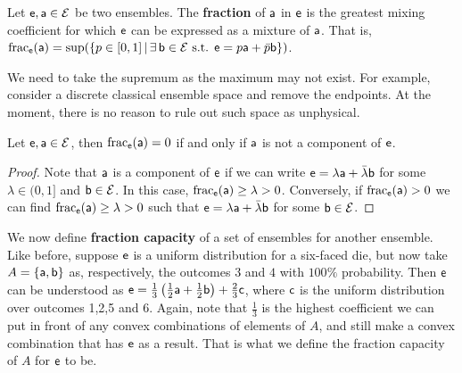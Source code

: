 \begin{mathSection}
	\begin{defn}
		Let $\ens, \ens[a] \in \Ens$ be two ensembles. The \textbf{fraction} of $\ens[a]$ in $\ens$ is the greatest mixing coefficient for which $\ens$ can be expressed as a mixture of $\ens[a]$. That is, $\size_{\ens}(\ens[a]) = \sup(\{ p \in [0,1] \, | \, \exists \, \ens[b] \in \Ens \text{ s.t. }  \ens = p \ens[a] + \bar{p} \ens[b] \})$.
	\end{defn}
	
	\begin{remark}
		We need to take the supremum as the maximum may not exist. For example, consider a discrete classical ensemble space and remove the endpoints. At the moment, there is no reason to rule out such space as unphysical.
	\end{remark}
	
	\begin{coro}
		Let $\ens, \ens[a] \in \Ens$, then $\size_{\ens}(\ens[a]) = 0$ if and only if $\ens[a]$ is not a component of $\ens$.
	\end{coro}
	
	\begin{proof}
		Note that $\ens[a]$ is a component of $\ens$ if we can write $\ens = \lambda \ens[a] + \bar{\lambda} \ens[b]$ for some $\lambda \in (0,1]$ and $\ens[b] \in \Ens$. In this case, $\size_{\ens}(\ens[a]) \geq \lambda > 0$. Conversely, if $\size_{\ens}(\ens[a]) > 0$ we can find $\size_{\ens}(\ens[a]) \geq \lambda > 0$ such that $\ens = \lambda \ens[a] + \bar{\lambda} \ens[b]$ for some $\ens[b] \in \Ens$.
	\end{proof}
\end{mathSection}

We now define \textbf{fraction capacity} of a set of ensembles for another ensemble. Like before, suppose $\ens$ is a uniform distribution for a six-faced die, but now take $A = \{ \ens[a], \ens[b] \}$ as, respectively, the outcomes $3$ and $4$ with $100\%$ probability. Then $\ens$ can be understood as $\ens = \frac{1}{3} \left(\frac{1}{2} \ens[a] + \frac{1}{2} \ens[b] \right) + \frac{2}{3} \ens[c]$, where $\ens[c]$ is the uniform distribution over outcomes 1,2,5 and 6. Again, note that $\frac{1}{3}$ is the highest coefficient we can put in front of any convex combinations of elements of $A$, and still make a convex combination that has $\ens$ as a result. That is what we define the fraction capacity of $A$ for $\ens$ to be.

